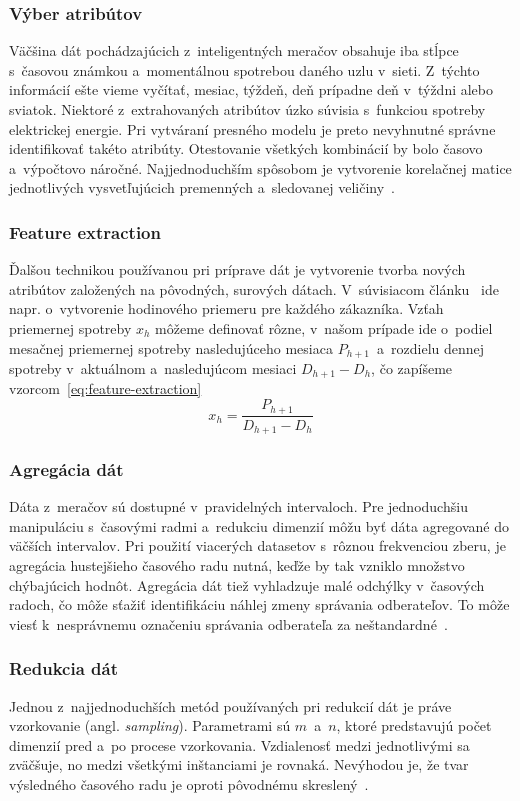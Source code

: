 \documentclass[a4paper,twoside,slovak,12pt,appendix]{article}
\begin{document}
\subsubsection{Výber atribútov}
Väčšina dát pochádzajúcich z~inteligentných meračov obsahuje iba stĺpce
s~časovou známkou a~momentálnou spotrebou daného uzlu v~sieti. Z~týchto
informácií ešte vieme vyčítať, mesiac, týždeň, deň prípadne deň v~týždni alebo
sviatok. Niektoré z~extrahovaných atribútov úzko súvisia s~funkciou spotreby
elektrickej energie. Pri vytváraní presného modelu je preto nevyhnutné správne
identifikovať takéto atribúty. Otestovanie všetkých kombinácií by bolo časovo
a~výpočtovo náročné. Najjednoduchším spôsobom je vytvorenie korelačnej matice
jednotlivých vysvetľujúcich premenných a~sledovanej veličiny~\cite{Cody2015}.

\subsubsection{Feature extraction}
Ďalšou technikou používanou pri príprave dát je vytvorenie tvorba nových
atribútov založených na pôvodných, surových dátach. V~súvisiacom
článku~\cite{Nagi2009} ide napr. o~vytvorenie hodinového priemeru pre každého
zákazníka. Vzťah priemernej spotreby $x_h$ môžeme definovať rôzne, v~našom
prípade ide o~podiel mesačnej priemernej spotreby nasledujúceho mesiaca
$P_{h+1}$~a~rozdielu dennej spotreby v~aktuálnom a~nasledujúcom mesiaci
$D_{h+1} - D_{h}$, čo zapíšeme vzorcom~\ref{eq:feature-extraction}
\begin{equation}
	\label{eq:feature-extraction}
  x_h = \frac{P_{h+1}}{D_{h+1} - D_{h}}
\end{equation}

\subsubsection{Agregácia dát}
Dáta z~meračov sú dostupné v~pravidelných intervaloch. Pre jednoduchšiu
manipuláciu s~časovými radmi a~redukciu dimenzií môžu byť dáta agregované do
väčších intervalov. Pri použití viacerých datasetov s~rôznou frekvenciou zberu,
je agregácia hustejšieho časového radu nutná, keďže by tak vzniklo množstvo
chýbajúcich hodnôt. Agregácia dát tiež vyhladzuje malé odchýlky v~časových
radoch, čo môže sťažiť identifikáciu náhlej zmeny správania odberateľov. To môže
viesť k~nesprávnemu označeniu správania odberateľa za
neštandardné~\cite{Cody2015}.

\subsubsection{Redukcia dát}
Jednou z~najjednoduchších metód používaných pri redukcií dát je práve
vzorkovanie (angl. \textit{sampling}). Parametrami sú $m$~a~$n$, ktoré
predstavujú počet dimenzií pred a~po procese vzorkovania. Vzdialenosť medzi
jednotlivými sa zväčšuje, no medzi všetkými inštanciami je rovnaká. Nevýhodou
je, že tvar výsledného časového radu je oproti pôvodnému skreslený~\cite{Fu2011}.
\end{document}
